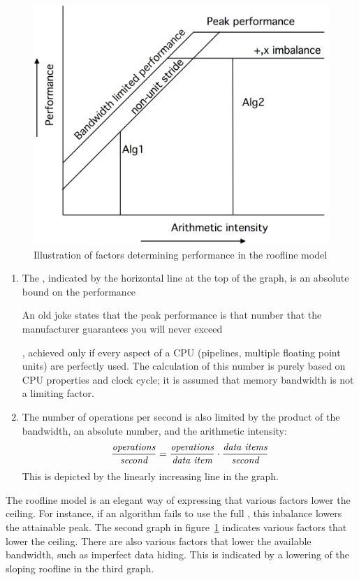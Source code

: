 \begin{figure}[p]
  \includegraphics[scale=.1]{graphics/roofline3}

  \caption{Illustration of factors determining performance in the roofline model}
  \label{fig:roofline}
\end{figure}
\begin{enumerate}
\item The , indicated by the horizontal
  line at the top of the graph, is an absolute bound on the
  performance
  \begin{footnoteenv}
    {An old joke states that the peak performance
    is that number that the manufacturer guarantees you will never
    exceed}
  \end{footnoteenv}%
  , achieved only if every aspect of a \ac{CPU} (pipelines,
  multiple floating point units) are perfectly used. The calculation
  of this number is purely based on \ac{CPU} properties and clock cycle; it
  is assumed that memory bandwidth is not a limiting factor.
\item The number of operations per second is also limited by the
  product of the bandwidth, an absolute number, and the arithmetic
  intensity:
  \[ \frac{\hbox{\it operations}}{\hbox{\it second}}=
  \frac{\hbox{\it operations}}{\hbox{\it data item}}\cdot
  \frac{\hbox{\it data items}}{\hbox{\it second}}
  \]
  This is depicted by the linearly increasing line in the graph.
\end{enumerate}
The roofline model is an elegant way of expressing that various
factors lower the ceiling.  For instance, if an algorithm fails to use
the full , this inbalance lowers the
attainable peak.  The second graph in figure~\ref{fig:roofline}
indicates various factors that lower the ceiling.
%
There are also various factors that lower the available bandwidth,
such as imperfect data hiding. This is indicated by a lowering of the 
sloping roofline in the third graph.


